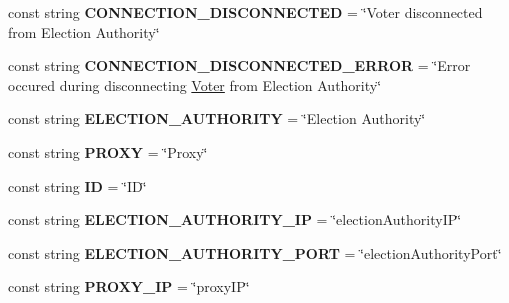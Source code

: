 \begin{DoxyCompactItemize}
\item 
\hypertarget{class_voter_1_1_constants_ae256592800931ae3f9eba5189b3052f0}{}const string {\bfseries C\+O\+N\+N\+E\+C\+T\+I\+O\+N\+\_\+\+D\+I\+S\+C\+O\+N\+N\+E\+C\+T\+E\+D} = \char`\"{}Voter disconnected from Election Authority\char`\"{}\label{class_voter_1_1_constants_ae256592800931ae3f9eba5189b3052f0}

\item 
\hypertarget{class_voter_1_1_constants_a90652e3085b3fc2e4897352d1b0edd2d}{}const string {\bfseries C\+O\+N\+N\+E\+C\+T\+I\+O\+N\+\_\+\+D\+I\+S\+C\+O\+N\+N\+E\+C\+T\+E\+D\+\_\+\+E\+R\+R\+O\+R} = \char`\"{}Error occured during disconnecting \hyperlink{class_voter_1_1_voter}{Voter} from Election Authority\char`\"{}\label{class_voter_1_1_constants_a90652e3085b3fc2e4897352d1b0edd2d}

\item 
\hypertarget{class_voter_1_1_constants_a6c54e72b5b5c69b6d19433eef3cfbe18}{}const string {\bfseries E\+L\+E\+C\+T\+I\+O\+N\+\_\+\+A\+U\+T\+H\+O\+R\+I\+T\+Y} = \char`\"{}Election Authority\char`\"{}\label{class_voter_1_1_constants_a6c54e72b5b5c69b6d19433eef3cfbe18}

\item 
\hypertarget{class_voter_1_1_constants_a5a9385e75f5c2115f9b515d597ac001c}{}const string {\bfseries P\+R\+O\+X\+Y} = \char`\"{}Proxy\char`\"{}\label{class_voter_1_1_constants_a5a9385e75f5c2115f9b515d597ac001c}

\item 
\hypertarget{class_voter_1_1_constants_a60aee365241f6bdba14d1864c3c25a04}{}const string {\bfseries I\+D} = \char`\"{}I\+D\char`\"{}\label{class_voter_1_1_constants_a60aee365241f6bdba14d1864c3c25a04}

\item 
\hypertarget{class_voter_1_1_constants_a88aeeb9329f226fb6f1d3c7cca5d5424}{}const string {\bfseries E\+L\+E\+C\+T\+I\+O\+N\+\_\+\+A\+U\+T\+H\+O\+R\+I\+T\+Y\+\_\+\+I\+P} = \char`\"{}election\+Authority\+I\+P\char`\"{}\label{class_voter_1_1_constants_a88aeeb9329f226fb6f1d3c7cca5d5424}

\item 
\hypertarget{class_voter_1_1_constants_a310c404e86222cb0bdb702916653d3dc}{}const string {\bfseries E\+L\+E\+C\+T\+I\+O\+N\+\_\+\+A\+U\+T\+H\+O\+R\+I\+T\+Y\+\_\+\+P\+O\+R\+T} = \char`\"{}election\+Authority\+Port\char`\"{}\label{class_voter_1_1_constants_a310c404e86222cb0bdb702916653d3dc}

\item 
\hypertarget{class_voter_1_1_constants_a2a35080f995e8dbd93c2ea18169a3a50}{}const string {\bfseries P\+R\+O\+X\+Y\+\_\+\+I\+P} = \char`\"{}proxy\+I\+P\char`\"{}\label{class_voter_1_1_constants_a2a35080f995e8dbd93c2ea18169a3a50}


\end{DoxyCompactItemize}

